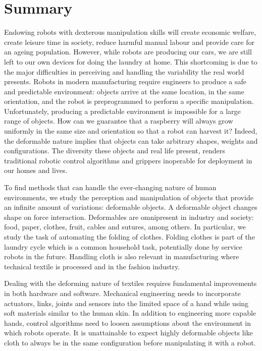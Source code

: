 \documentclass[\home/main.tex]{subfiles}
\begin{document}

\chapter{Summary}

Endowing robots with dexterous manipulation skills will create economic welfare, create leisure time in society, reduce harmful manual labour and provide care for an ageing population. 
However, while robots are producing our cars, we are still left to our own devices for doing the laundry at home. This shortcoming is due to the major difficulties in perceiving and handling the variability the real world presents. 
Robots in modern manufacturing require engineers to produce a safe and predictable environment: objects arrive at the same location, in the same orientation, and the robot is preprogrammed to perform a specific manipulation. 
Unfortunately, producing a predictable environment is impossible for a large range of objects. How can we guarantee that a raspberry will always grow uniformly in the same size and orientation so that a robot can harvest it? Indeed, the deformable nature implies that objects can take arbitrary shapes, weights and configurations. The diversity these objects and real life present, renders traditional robotic control algorithms and grippers inoperable for deployment in our homes and lives.

To find methods that can handle the ever-changing nature of human environments, we study the perception and manipulation of objects that provide an infinite amount of variations: deformable objects. A deformable object changes shape on force interaction. Deformables are omnipresent in industry and society: food, paper, clothes, fruit, cables and sutures, among others. In particular, we study the task of automating the folding of clothes. Folding clothes is part of the laundry cycle which is a common household task, potentially done by service robots in the future. Handling cloth is also relevant in manufacturing where technical textile is processed and in the fashion industry.

Dealing with the deforming nature of textiles requires fundamental improvements in both hardware and software. Mechanical engineering needs to incorporate actuators, links, joints and sensors into the limited space of a hand while using soft materials similar to the human skin. In addition to engineering more capable hands, control algorithms need to loosen assumptions about the environment in which robots operate. It is unattainable to expect highly deformable objects like cloth to always be in the same configuration before manipulating it with a robot. 
\end{document}
